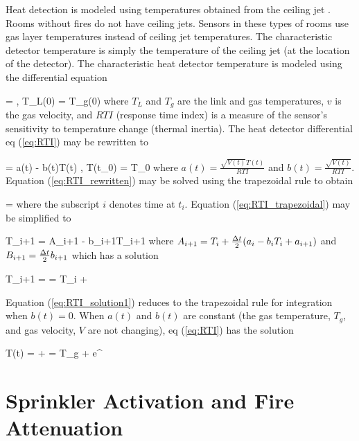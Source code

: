 Heat detection is modeled using temperatures obtained from the ceiling jet \cite{Cooper:1991}. Rooms without fires do not have ceiling jets. Sensors in these types of rooms use gas layer temperatures instead of ceiling jet temperatures. The characteristic detector temperature is simply the temperature of the ceiling jet (at the location of the detector). The characteristic heat detector temperature is modeled using the differential equation \cite{Heskestad:1976}

\be {} =   \; , \; T_L(0) = T_g(0)\label{eq:RTI} \ee
where $T_L$ and $T_g$ are the link and gas temperatures, $v$ is the gas velocity, and $RTI$ (response time index) is a measure of the sensor's sensitivity to temperature change (thermal inertia).  The heat detector differential eq (\ref{eq:RTI}) may be rewritten to

\be {} = a(t) - b(t)T(t) \; , \; T(t_0) = T_0 \label{eq:RTI_rewritten} \ee
where $a(t) = \frac{\sqrt{V(t)}T(t)}{RTI}$ and $b(t) = \frac{\sqrt{V(t)}}{RTI}$. Equation (\ref{eq:RTI_rewritten}) may be solved using the trapezoidal rule to obtain

\be {} =   \label{eq:RTI_trapezoidal} \ee
where the subscript $i$ denotes time at $t_i$. Equation (\ref{eq:RTI_trapezoidal}) may be simplified to

\be T_{i+1} = A_{i+1} - b_{i+1}T_{i+1} \label{eq:RTI_trapezoidal_simplified} \ee
where $A_{i+1} = T_i + {\frac{\Delta t}{2}} { \left( {a_i - b_iT_i + a_{i+1}} \right) }$ and $B_{i+1} = {\frac{\Delta t}{2}} b_{i+1}$ which has a solution

\be T_{i+1} =  =  T_i  +  \label{eq:RTI_solution1} \ee

Equation (\ref{eq:RTI_solution1}) reduces to the trapezoidal rule for integration when $b(t) = 0$. When $a(t)$ and $b(t)$ are constant (the gas temperature, $T_g$, and gas velocity, $V$ are not changing), eq (\ref{eq:RTI}) has the solution

\be T(t) =  +  = T_g + e^{}
 \ee

\section{Sprinkler Activation and Fire Attenuation} \label{sec:suppression}

